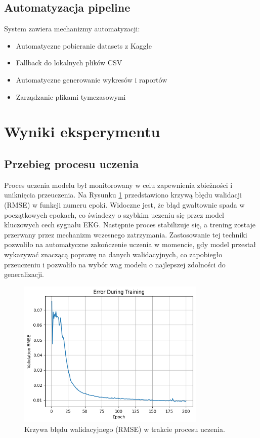 \documentclass[12pt,a4paper]{article}
\begin{document}
\subsection{Automatyzacja pipeline}

System zawiera mechanizmy automatyzacji:
\begin{itemize}
    \item Automatyczne pobieranie datasets z Kaggle
    \item Fallback do lokalnych plików CSV
    \item Automatyczne generowanie wykresów i raportów
    \item Zarządzanie plikami tymczasowymi
\end{itemize}

\section{Wyniki eksperymentu}

\subsection{Przebieg procesu uczenia}

Proces uczenia modelu był monitorowany w celu zapewnienia zbieżności i uniknięcia przeuczenia. Na Rysunku \ref{fig:training_error} przedstawiono krzywą błędu walidacji (RMSE) w funkcji numeru epoki. Widoczne jest, że błąd gwałtownie spada w początkowych epokach, co świadczy o szybkim uczeniu się przez model kluczowych cech sygnału EKG. Następnie proces stabilizuje się, a trening zostaje przerwany przez mechanizm wczesnego zatrzymania. Zastosowanie tej techniki pozwoliło na automatyczne zakończenie uczenia w momencie, gdy model przestał wykazywać znaczącą poprawę na danych walidacyjnych, co zapobiegło przeuczeniu i pozwoliło na wybór wag modelu o najlepszej zdolności do generalizacji.

\begin{figure}[H]
    \centering
    \includegraphics[width=0.8\textwidth]{training_error.png}
    \caption{Krzywa błędu walidacyjnego (RMSE) w trakcie procesu uczenia.}
    \label{fig:training_error}
\end{figure}
\end{document}
